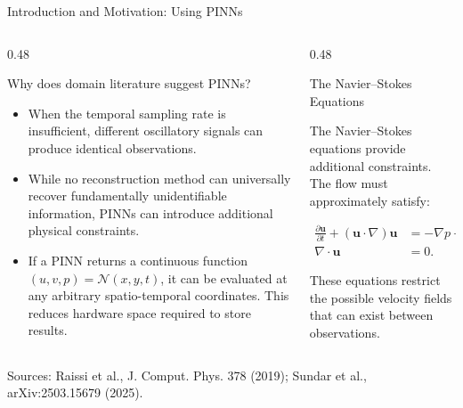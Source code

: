 \documentclass[12pt]{beamer}
\begin{document}

\begin{frame}{Introduction and Motivation: Using PINNs}

  \begin{columns}[T,onlytextwidth]

    \begin{column}{0.48\textwidth}

      Why does domain literature suggest PINNs?

      \begin{itemize}

        \item When the temporal sampling rate is insufficient, different oscillatory signals can produce identical observations.

        \item While no reconstruction method can universally recover fundamentally unidentifiable information, PINNs can introduce additional physical constraints.

        \item If a PINN returns a continuous function $(u, v, p) = \mathcal{N}(x,y,t)$, it can be evaluated at any arbitrary spatio-temporal coordinates. This reduces hardware space required to store results.

      \end{itemize}

    \end{column}

    \begin{column}{0.48\textwidth}

      \begin{alertblock}{The Navier--Stokes Equations}

        The Navier--Stokes equations provide additional constraints. The flow must approximately satisfy:

\[
\begin{aligned}
\frac{\partial \mathbf{u}}{\partial t}+(\mathbf{u}\cdot\nabla)\mathbf{u}
 &= -\nabla p+\frac{1}{Re}\nabla^2\mathbf{u},\\
\nabla\cdot\mathbf{u}&=0.
\end{aligned}
\]

        These equations restrict the possible velocity fields that can exist between observations.

      \end{alertblock}

    \end{column}

  \end{columns}

  {\tiny\color{steel}Sources: Raissi et al., J. Comput. Phys. 378 (2019); Sundar et al., arXiv:2503.15679 (2025).}

\end{frame}
\end{document}
